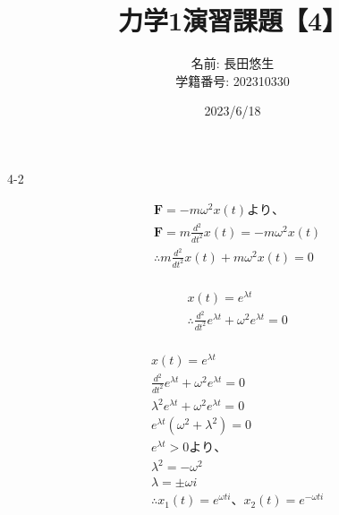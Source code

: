 \documentclass[dvipdfmx,uplatex]{jsarticle}
\title{力学1演習課題【4】}
\author{
    名前: 長田悠生\\
    学籍番号: 202310330\\
}
\date{2023/6/18}
\begin{document}
  \begin{titlepage}
    \maketitle
    \begin{center}
      \textmc{\HUGE \LaTeX}
    \end{center}
    \thispagestyle{empty}
  \end{titlepage}

  \centerline{\LARGE 4-2}
  \vspace{10mm}
  \begin{equation}
    \begin{aligned}
        &\bm{F} = - m\omega^2x(t)より、\nonumber\\
        &\bm{F} = m\frac{d^2}{dt^2}x(t) = -m\omega^2x(t)\nonumber\\
        &\therefore m\frac{d^2}{dt^2}x(t) + m\omega^2x(t) = 0\nonumber\\
    \end{aligned}
  \end{equation}

  \begin{equation}
    \begin{aligned}
        &x(t) = e^{\lambda t}\nonumber\\
        &\therefore \frac{d^2}{dt^2}e^{\lambda t} + \omega^2e^{\lambda t} = 0\nonumber\\
    \end{aligned}
  \end{equation}

  \begin{equation}
    \begin{aligned}
        &x(t) = e^{\lambda t}\nonumber\\
        &\frac{d^2}{dt^2}e^{\lambda t} + \omega^2e^{\lambda t} = 0\nonumber\\
        &\lambda^2e^{\lambda t} + \omega^2e^{\lambda t} = 0\nonumber\\
        &e^{\lambda t}(\omega^2 + \lambda^2) = 0\nonumber\\
        &e^{\lambda t} > 0より、\nonumber\\
        &\lambda^2 = -\omega^2\nonumber\\
        &\lambda = \pm \omega i\nonumber\\
        &\therefore {x}_{1}(t) = e^{\omega t i}、{x}_{2}(t) = e^{-\omega t i}\nonumber\\
    \end{aligned}
  \end{equation}
\end{document}
